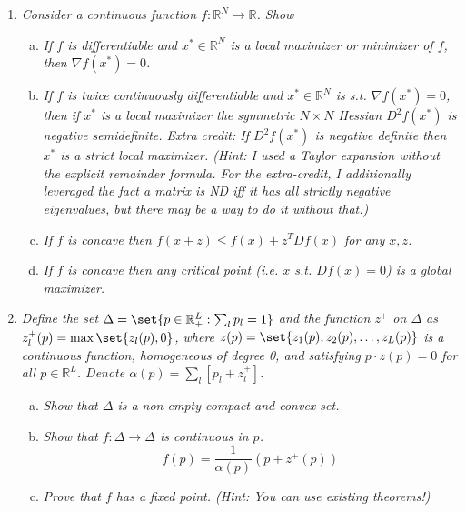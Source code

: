 \documentclass{article}
\begin{document}
\begin{enumerate}[1.]
  \item {\itshape
      Consider a continuous function $f: \mathbb{R}^N \to \mathbb{R}$. Show

    \begin{enumerate}[a)]
      \item \textit{If $f$ is differentiable and $x^* \in \mathbb{R}^N$ is a local maximizer or minimizer of $f$, then $\nabla f(x^*) = 0$.}

      \item \textit{If $f$ is twice continuously differentiable and $x^* \in \mathbb{R}^N$ is s.t. $\nabla f(x^*) = 0$, then if $x^*$ is a local maximizer the symmetric $N \times N$ Hessian $D^2f(x^*)$ is negative semidefinite. Extra credit: If $D^2f(x^*)$ is negative definite then $x^*$ is a strict local maximizer. (Hint: I used a Taylor expansion without the explicit remainder formula. For the extra-credit, I additionally leveraged the fact a matrix is ND iff it has all strictly negative eigenvalues, but there may be a way to do it without that.)}

      \item \textit{If $f$ is concave then $f(x + z) \le f(x) + z^T Df(x)$ for any $x, z$.}

      \item \textit{If $f$ is concave then any critical point (i.e. $x$ s.t. $Df(x) = 0$) is a global maximizer.}
    \end{enumerate}
  }

  \item {\itshape
      Define the set $\Delta = \set{p \in \mathbb{R}^L_{+}: \sum^{}_{l} p_l = 1}$ and the function $z^+$ on $\Delta$ as $z^+_l(p) = \max\set{z_l(p), 0}$, where $z(p) = \set{z_1(p), z_2(p), \ldots, z_L(p)}$ is a continuous function, homogeneous of degree 0, and satisfying $p \cdot z(p) = 0$ for all $p \in \mathbb{R}^L$. Denote $\alpha(p) = \sum^{}_{l} \left[p_l + z_l^+\right]$.

    \begin{enumerate}[a)]
      \item \textit{Show that $\Delta$ is a non-empty compact and convex set.}

      \item \textit{Show that $f: \Delta \to \Delta$ is continuous in $p$.}
        \[
          f(p) = \dfrac{1}{\alpha(p)} \left(p + z^+(p)\right)
        \]

      \item \textit{Prove that $f$ has a fixed point. (Hint: You can use existing theorems!)}


\end{enumerate}}
\end{enumerate}
\end{document}
